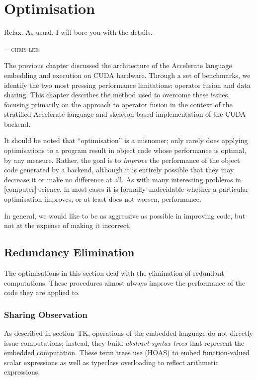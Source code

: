 
\chapter{Optimisation}
\epigraph{Relax. As usual, I will bore you with the details.}%
{\textsc{---chris lee}}

The previous chapter discussed the architecture of the Accelerate language
embedding and execution on CUDA hardware. Through a set of benchmarks, we
identify the two most pressing performance limitations: operator fusion and data
sharing. This chapter describes the method used to overcome these issues,
focusing primarily on the approach to operator fusion in the context of the
stratified Accelerate language and skeleton-based implementation of the CUDA
backend.

It should be noted that ``optimisation'' is a misnomer; only rarely does
applying optimisations to a program result in object code whose performance is
optimal, by any measure. Rather, the goal is to \emph{improve} the performance
of the object code generated by a backend, although it is entirely possible that
they may decrease it or make no difference at all. As with many interesting
problems in [computer] science, in most cases it is formally undecidable whether
a particular optimisation improves, or at least does not worsen, performance.

In general, we would like to be as aggressive as possible in improving code, but
not at the expense of making it incorrect.


\section{Redundancy Elimination}
\label{sec:redundancy_elimination}

The optimisations in this section deal with the elimination of redundant
computations. These procedures almost always improve the performance of the code
they are applied to.

\subsection{Sharing Observation}

As described in section~TK, operations of the embedded language do not
directly issue computations; instead, they build \emph{abstract syntax
trees} that
represent the embedded computation. These term trees use  (HOAS) to embed
function-valued scalar expressions as well as typeclass overloading to reflect
arithmetic expressions.


